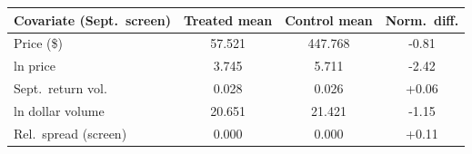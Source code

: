 \begin{tabular}{lccc}
\toprule
Covariate (Sept.\ screen) & Treated mean & Control mean & Norm.\ diff. \\
\midrule
Price (\$) & 57.521 & 447.768 & -0.81 \\
ln price & 3.745 & 5.711 & -2.42 \\
Sept.\ return vol. & 0.028 & 0.026 & +0.06 \\
ln dollar volume & 20.651 & 21.421 & -1.15 \\
Rel.\ spread (screen) & 0.000 & 0.000 & +0.11 \\
\bottomrule
\end{tabular}